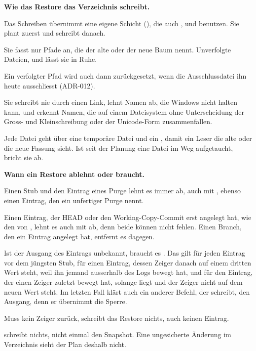 {\startinfobox
{\bf Wie das Restore das Verzeichnis schreibt.}
\startitemize
\item Das Schreiben übernimmt eine eigene Schicht (),
die auch ,  und  benutzen.
Sie plant zuerst und schreibt danach.
\item Sie fasst nur Pfade an, die der alte oder der neue Baum nennt.
Unverfolgte Dateien,  und  lässt sie in Ruhe.
\item Ein verfolgter Pfad wird auch dann zurückgesetzt,
wenn die Ausschlussdatei ihn heute ausschliesst (ADR-012).
\item Sie schreibt nie durch einen Link, lehnt Namen ab, die Windows nicht halten kann,
und erkennt Namen,
die auf einem Dateisystem ohne Unterscheidung der Gross- und Kleinschreibung
oder der Unicode-Form zusammenfallen.
\item Jede Datei geht über eine temporäre Datei und ein ,
damit ein Leser die alte oder die neue Fassung sieht.
Ist seit der Planung eine Datei im Weg aufgetaucht, bricht sie ab.
\stopitemize
\stopinfobox

\startinfobox
{\bf Wann ein Restore ablehnt oder  braucht.}
\startitemize
\item Einen Stub und den Eintrag eines Purge lehnt es immer ab, auch mit ,
ebenso einen Eintrag, den ein unfertiger Purge nennt.
\item Einen Eintrag, der HEAD oder den Working-Copy-Commit erst angelegt hat,
wie den von , lehnt es auch mit  ab, denn beide können nicht fehlen.
Einen Branch, den ein Eintrag angelegt hat, entfernt es dagegen.
\item Ist der Ausgang des Eintrags unbekannt, braucht es .
Das gilt für jeden Eintrag vor dem jüngsten Stub,
für einen Eintrag, dessen Zeiger danach auf einem dritten Wert steht,
weil ihn jemand ausserhalb des Logs bewegt hat,
und für den Eintrag, der einen Zeiger zuletzt bewegt hat,
solange  liegt und der Zeiger nicht auf dem neuen Wert steht.
Im letzten Fall klärt auch ein anderer Befehl, der schreibt, den Ausgang,
denn er übernimmt die Sperre.
\item Muss kein Zeiger zurück, schreibt das Restore nichts, auch keinen Eintrag.
\item {} schreibt nichts, nicht einmal den Snapshot.
Eine ungesicherte Änderung im Verzeichnis sieht der Plan deshalb nicht.
\stopitemize
\stopinfobox

}

